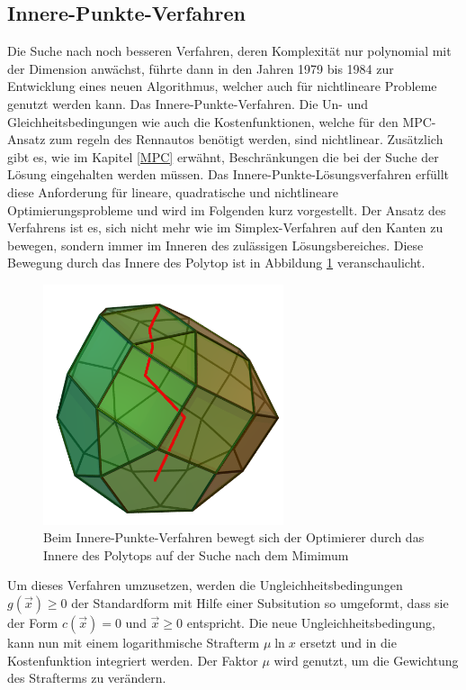 \documentclass{like}
\begin{document}
\subsection{Innere-Punkte-Verfahren} 
\label{ipm} 
Die Suche nach noch besseren Verfahren, deren Komplexität nur polynomial mit der Dimension anwächst, führte dann in den Jahren 1979 bis 1984 zur Entwicklung eines neuen Algorithmus, welcher auch für nichtlineare Probleme genutzt werden kann. Das Innere-Punkte-Verfahren. Die Un- und Gleichheitsbedingungen wie auch die Kostenfunktionen, welche für den \ac{MPC}-Ansatz zum regeln des Rennautos benötigt werden, sind nichtlinear. Zusätzlich gibt es, wie im Kapitel \ref{MPC} erwähnt, Beschränkungen die bei der Suche der Lösung eingehalten werden müssen. Das Innere-Punkte-Lösungsverfahren erfüllt diese Anforderung für lineare, quadratische und nichtlineare Optimierungsprobleme und wird im Folgenden kurz vorgestellt. Der Ansatz des Verfahrens ist es, sich nicht mehr wie im Simplex-Verfahren auf den Kanten zu bewegen, sondern immer im Inneren des zulässigen Lösungsbereiches. Diese Bewegung durch das Innere des Polytop ist in Abbildung \ref{fig:iterPointMethod} veranschaulicht.  
\begin{figure}[ht!]
	\centering
	\includegraphics[width=200pt]{Abbildungen/iterPointMethod.png}
	\caption{Beim Innere-Punkte-Verfahren bewegt sich der Optimierer durch das Innere des Polytops auf der Suche nach dem Mimimum}
	\label{fig:iterPointMethod}
\end{figure}

Um dieses Verfahren umzusetzen, werden die Ungleichheitsbedingungen $g(\vec{x}) \geq 0$ der Standardform mit Hilfe einer Subsitution so umgeformt, dass sie der Form $c(\vec{x}) = 0$ und $\vec{x} \geq  0$ entspricht. Die neue Ungleichheitsbedingung, kann nun mit einem logarithmische Strafterm $ \mu \ln x $  ersetzt und in die Kostenfunktion integriert werden. 
Der Faktor $\mu$ wird genutzt, um die Gewichtung des Strafterms zu verändern.
\end{document}
